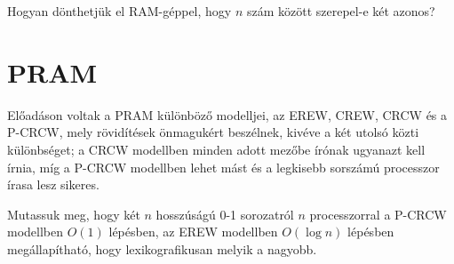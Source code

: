 \begin{Exercise}[counter={sorszam}, difficulty=0]
	Hogyan dönthetjük el RAM-géppel, hogy $n$ szám között szerepel-e két azonos?
\end{Exercise}		 


\section{PRAM}

 El\H oadáson voltak a PRAM k\"ul\"onb\"oz\H o modelljei, az EREW, CREW, CRCW \'es a P-CRCW, mely r\"ovid\'it\'esek \"onmaguk\'ert besz\'elnek, kiv\'eve a k\'et utols\'o k\"ozti k\"ul\"onbs\'eget; a CRCW modellben minden adott mez\H obe \'ir\'onak ugyanazt kell \'irnia, m\'ig a P-CRCW modellben lehet m\'ast \'es a legkisebb sorsz\'am\'u processzor \'irasa lesz sikeres.



\begin{Exercise}[counter={sorszam}, difficulty=0]
	Mutassuk meg, hogy két $n$ hosszúságú 0-1 sorozatról $n$ processzorral a P-CRCW modellben $O(1)$ lépésben, az EREW modellben $O(\log n)$ lépésben megállapítható, hogy lexikografikusan melyik a nagyobb.
\end{Exercise}	


